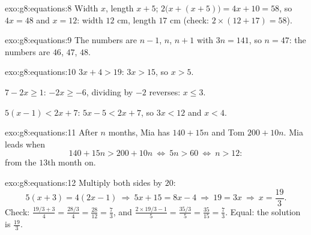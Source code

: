 \begin{solution}{exo:g8:equations:8}
Width $x$, length $x + 5$; 
$2\bigl(x + (x + 5)\bigr) = 4x + 10 = 58$, so $4x = 48$ and $x = 12$:
width $12$ cm, length $17$ cm (check:
$2 \times (12 + 17) = 58$).
\end{solution}

\begin{solution}{exo:g8:equations:9}
The numbers are $n - 1$, $n$, $n + 1$ with  $3n = 141$, so
$n = 47$: the numbers are $46$, $47$, $48$.
\end{solution}

\begin{solution}{exo:g8:equations:10}
$3x + 4 > 19$: $3x > 15$, so $x > 5$.

$7 - 2x \geq 1$: $-2x \geq -6$, dividing by $-2$ reverses:
$x \leq 3$.

$5(x-1) < 2x + 7$: $5x - 5 < 2x + 7$, so $3x < 12$ and $x < 4$.
\end{solution}

\begin{solution}{exo:g8:equations:11}
After $n$ months, Mia has $140 + 15n$ and Tom $200 + 10n$. Mia leads
when
\[
140 + 15n > 200 + 10n
\ \Longleftrightarrow\
5n > 60
\ \Longleftrightarrow\
n > 12 :
\]
from the $13$th month on.
\end{solution}

\begin{solution}{exo:g8:equations:12}
Multiply both sides by $20$:
\[
5(x + 3) = 4(2x - 1)
\ \Longrightarrow\
5x + 15 = 8x - 4
\ \Longrightarrow\
19 = 3x
\ \Longrightarrow\
x = \frac{19}{3}.
\]
Check: $\frac{19/3 + 3}{4} = \frac{28/3}{4} = \frac{28}{12} =
\frac73$, and $\frac{2 \times 19/3 - 1}{5} = \frac{35/3}{5} =
\frac{35}{15} = \frac73$. Equal: the solution is $\frac{19}{3}$.
\end{solution}

